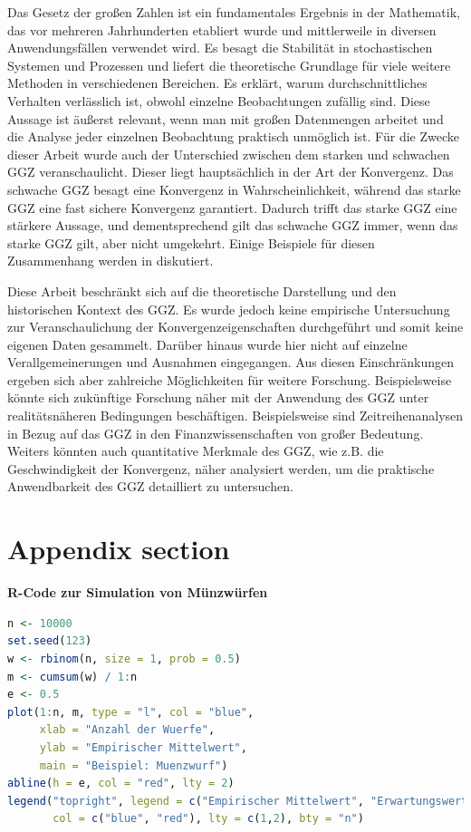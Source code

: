 \documentclass[aodsor,preprint]{imsart}
\numberwithin{equation}{section}
\theoremstyle{plain}
\begin{document}
Das Gesetz der großen Zahlen ist ein fundamentales Ergebnis in der Mathematik, das vor mehreren Jahrhunderten etabliert wurde und mittlerweile in diversen Anwendungsfällen verwendet wird.
Es besagt die Stabilität in stochastischen Systemen und Prozessen und liefert die theoretische Grundlage für viele weitere Methoden in verschiedenen Bereichen.
Es erklärt, warum durchschnittliches Verhalten verlässlich ist, obwohl einzelne Beobachtungen zufällig sind.
Diese Aussage ist äußerst relevant, wenn man mit großen Datenmengen arbeitet und die Analyse jeder einzelnen Beobachtung praktisch unmöglich ist.
Für die Zwecke dieser Arbeit wurde auch der Unterschied zwischen dem starken und schwachen GGZ veranschaulicht.
Dieser liegt hauptsächlich in der Art der Konvergenz.
Das schwache GGZ besagt eine Konvergenz in Wahrscheinlichkeit, während das starke GGZ eine fast sichere Konvergenz garantiert.
Dadurch trifft das starke GGZ eine stärkere Aussage, und dementsprechend gilt das schwache GGZ immer, wenn das starke GGZ gilt, aber nicht umgekehrt.
Einige Beispiele für diesen Zusammenhang werden in \citet{stoyanov2013} diskutiert.


Diese Arbeit beschränkt sich auf die theoretische Darstellung und den historischen Kontext des GGZ.
Es wurde jedoch keine empirische Untersuchung zur Veranschaulichung der Konvergenzeigenschaften durchgeführt und somit keine eigenen Daten gesammelt.
Darüber hinaus wurde hier nicht auf einzelne Verallgemeinerungen und Ausnahmen eingegangen.
Aus diesen Einschränkungen ergeben sich aber zahlreiche Möglichkeiten für weitere Forschung.
Beispielsweise könnte sich zukünftige Forschung näher mit der Anwendung des GGZ unter realitätsnäheren Bedingungen beschäftigen.
Beispielsweise sind Zeitreihenanalysen in Bezug auf das GGZ in den Finanzwissenschaften von großer Bedeutung.
Weiters könnten auch quantitative Merkmale des GGZ, wie z.B. die Geschwindigkeit der Konvergenz, näher analysiert werden, um die praktische Anwendbarkeit des GGZ detailliert zu untersuchen.

\newpage


\appendix


\section{Appendix section}
\label{sec:app}

\textbf{R-Code zur Simulation von Münzwürfen}

\begin{lstlisting}[language=R, caption={Simulation von Münzwürfen mit R}, label={lst:muenzenwurf}]
n <- 10000
set.seed(123)
w <- rbinom(n, size = 1, prob = 0.5)
m <- cumsum(w) / 1:n
e <- 0.5
plot(1:n, m, type = "l", col = "blue",
     xlab = "Anzahl der Wuerfe",
     ylab = "Empirischer Mittelwert",
     main = "Beispiel: Muenzwurf")
abline(h = e, col = "red", lty = 2)
legend("topright", legend = c("Empirischer Mittelwert", "Erwartungswert (0.5)"),
       col = c("blue", "red"), lty = c(1,2), bty = "n")
\end{lstlisting}
\end{document}
